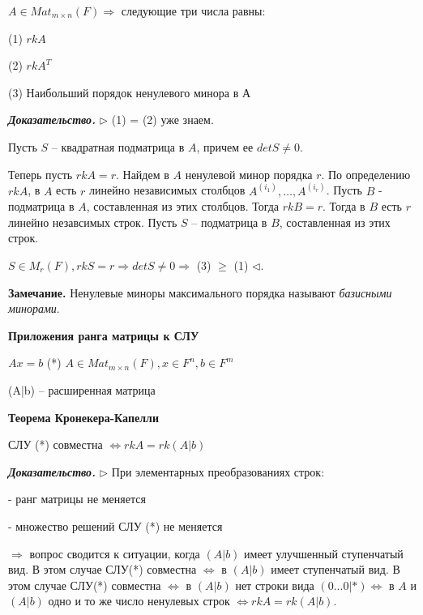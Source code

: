 $A \in Mat_{m \times n} (F) \Rightarrow$ следующие три числа равны:

(1) $rkA$

(2) $rkA^T$

(3) Наибольший порядок ненулевого минора в $А$

\vspace{\baselineskip}
\textbf{\textit{Доказательство.}} $\rhd$ (1) = (2) уже знаем.

Пусть $S$ -- квадратная подматрица в $A$, причем ее $detS \neq 0$.

\vspace{\baselineskip}
Теперь пусть $rkA = r$. Найдем в $A$ ненулевой минор порядка $r$. По определению $rkA$, в $A$ есть $r$ линейно независимых столбцов $A^{(i_1)}, \dots, A^{(i_r)}$. Пусть $B$ - подматрица в $A$, составленная из этих столбцов. Тогда $rkB = r$. Тогда в $B$ есть $r$ линейно незавсимых строк. Пусть $S$ -- подматрица в $B$, составленная из этих строк.

$S \in M_r(F), rkS = r \Rightarrow detS \neq 0 \Rightarrow$ (3) $\geq$ (1) $\lhd$.

\vspace{\baselineskip}
\textbf{Замечание.} Ненулевые миноры максимального порядка называют \textit{базисными минорами}.

\vspace{\baselineskip}
\textbf{Приложения ранга матрицы к СЛУ}

$Ax=b$ (*) $A \in Mat_{m \times n} (F), x \in F^n, b \in F^m$

(A|b) -- расширенная матрица

\vspace{\baselineskip}
\textbf{Теорема Кронекера-Капелли}

СЛУ (*) совместна $\Leftrightarrow rkA = rk(A|b)$

\vspace{\baselineskip}
\textbf{\textit{Доказательство.}} $\rhd$ При элементарных преобразованиях строк:

- ранг матрицы не меняется

- множество решений СЛУ (*) не меняется

$\Rightarrow$ вопрос сводится к ситуации, когда $(A|b)$ имеет улучшенный ступенчатый вид. В этом случае СЛУ(*) совместна $\Leftrightarrow$ в $(A|b)$ имеет ступенчатый вид. В этом случае СЛУ(*) совместна $\Leftrightarrow$ в $(A|b)$ нет строки вида $(0...0|*) \Leftrightarrow$ в $A$ и $(A|b)$ одно и то же число ненулевых строк $\Leftrightarrow rkA = rk(A|b)$.

